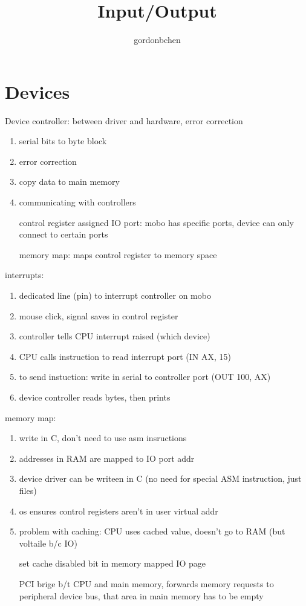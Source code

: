 \documentclass[11pt]{article}
\title{Input/Output}
\author{gordonbchen}
\date{}
\begin{document}
\maketitle

\section{Devices}
Device controller: between driver and hardware, error correction
\begin{enumerate}
    \item serial bits to byte block
    \item error correction
    \item copy data to main memory
    \item communicating with controllers

        control register assigned IO port: mobo has specific ports, device can only connect to certain ports

        memory map: maps control register to memory space
\end{enumerate}

interrupts:
\begin{enumerate}
    \item dedicated line (pin) to interrupt controller on mobo
    \item mouse click, signal saves in control register
    \item controller tells CPU interrupt raised (which device)
    \item CPU calls instruction to read interrupt port (IN AX, 15)
    \item to send instuction: write in serial to controller port (OUT 100, AX)
    \item device controller reads bytes, then prints
\end{enumerate}

memory map:
\begin{enumerate}
    \item write in C, don't need to use asm insructions
    \item addresses in RAM are mapped to IO port addr
    \item device driver can be writeen in C (no need for special ASM instruction, just files)
    \item os ensures control registers aren't in user virtual addr

    \item problem with caching: CPU uses cached value, doesn't go to RAM (but voltaile b/c IO)

        set cache disabled bit in memory mapped IO page

        PCI brige b/t CPU and main memory, forwards memory requests to peripheral device bus,
        that area in main memory has to be empty
\end{enumerate}
\end{document}
